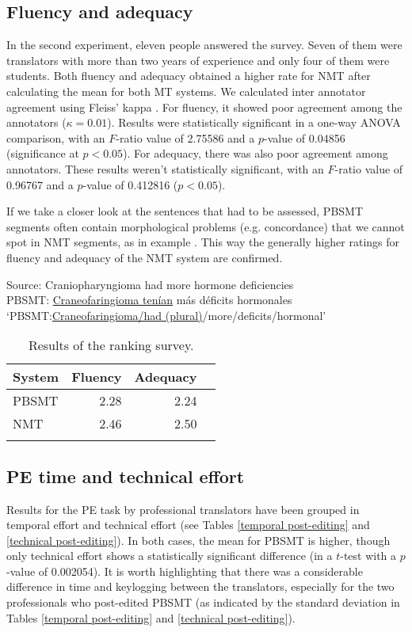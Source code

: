 \documentclass[output=paper]{langsci/langscibook}
\begin{document}
\subsection{Fluency and adequacy}
In the second experiment, eleven people answered the survey. Seven of them were translators with more than two years of experience and only four of them were students. Both fluency and adequacy obtained a higher rate for NMT after calculating the mean for both MT systems. We calculated inter annotator agreement using Fleiss' kappa \citep{fleiss1971}. For fluency, it showed poor agreement among the annotators ($\kappa=0.01$). Results were statistically significant in a one-way ANOVA comparison, with an $F$-ratio value of 2.75586 and a $p$-value of 0.04856 (significance at $p<0.05$). For adequacy, there was also poor agreement among annotators. These results weren't statistically significant, with an $F$-ratio value of 0.96767 and a $p$-value of 0.412816 ($p<0.05$). 

If we take a closer look at the sentences that had to be assessed, PBSMT segments often contain morphological problems (e.g. concordance) that we cannot spot in NMT segments, as in example . This way the generally higher ratings for fluency and adequacy of the NMT system are confirmed. 



\ea\label{example1}
\gll Source: Craniopharyngioma had more hormone deficiencies\\
PBSMT: \underline{Craneofaringioma tenían} más déficits hormonales\\
\glt `PBSMT:\underline{Craneofaringioma/had (plural)}/more/deficits/hormonal'
\z

\begin{table}
\begin{tabularx}{.66\textwidth}{Xrrr}
\lsptoprule
{System} & {Fluency} & {Adequacy}\\
\midrule
PBSMT & 2.28 & 2.24 \\
NMT & 2.46 & 2.50 \\
\lspbottomrule
\end{tabularx}
\caption{\label{eval-mteval1reference2}Results of the ranking survey.}
\end{table}

\subsection{PE time and technical effort}
Results for the PE task by professional translators have been grouped in temporal effort and technical effort (see Tables \ref{temporal post-editing} and \ref{technical post-editing}). In both cases, the mean for PBSMT is higher, though only technical effort shows a statistically significant difference (in a $t$-test with a $p$-value of 0.002054). It is worth highlighting that there was a considerable difference in time and keylogging between the translators, especially for the two professionals who post-edited PBSMT (as indicated by the standard deviation in Tables \ref{temporal post-editing} and \ref{technical post-editing}).
\end{document}
